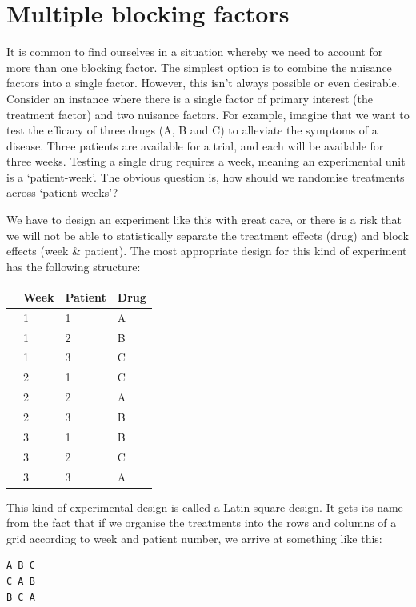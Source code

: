 \documentclass[
]{book}
\begin{document}
\hypertarget{multiple-blocking-factors}{%
\section{Multiple blocking factors}\label{multiple-blocking-factors}}

It is common to find ourselves in a situation whereby we need to account for more than one blocking factor. The simplest option is to combine the nuisance factors into a single factor. However, this isn't always possible or even desirable. Consider an instance where there is a single factor of primary interest (the treatment factor) and two nuisance factors. For example, imagine that we want to test the efficacy of three drugs (A, B and C) to alleviate the symptoms of a disease. Three patients are available for a trial, and each will be available for three weeks. Testing a single drug requires a week, meaning an experimental unit is a `patient-week'. The obvious question is, how should we randomise treatments across `patient-weeks'?

We have to design an experiment like this with great care, or there is a risk that we will not be able to statistically separate the treatment effects (drug) and block effects (week \& patient). The most appropriate design for this kind of experiment has the following structure:

\begin{longtable}[]{@{}clll@{}}
\toprule()
& Week & Patient & Drug \\
\midrule()
\endhead
& 1 & 1 & A \\
& 1 & 2 & B \\
& 1 & 3 & C \\
& 2 & 1 & C \\
& 2 & 2 & A \\
& 2 & 3 & B \\
& 3 & 1 & B \\
& 3 & 2 & C \\
& 3 & 3 & A \\
\bottomrule()
\end{longtable}

This kind of experimental design is called a Latin square design. It gets its name from the fact that if we organise the treatments into the rows and columns of a grid according to week and patient number, we arrive at something like this:

\begin{verbatim}
A B C 
C A B 
B C A
\end{verbatim}
\end{document}
